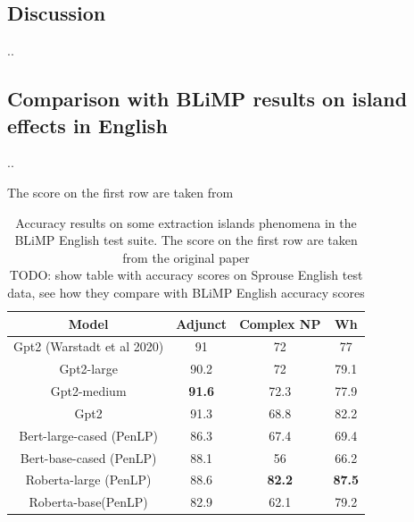 \subsection{Discussion}

..


\subsection{Comparison with BLiMP results on island effects in English}

..

The score on the first row are taken from \citet{warstadt2020blimp}

\begin{table} 
	\begin{center}
		\begin{tabular}{c|c|c|c} 
			Model & \textbf{Adjunct} & \textbf{Complex NP} & \textbf{Wh} \\
			\hline
			Gpt2 (Warstadt et al 2020) 	& 91 			& 72 			& 77 \\ 
			Gpt2-large 					& 90.2 			& 72 			& 79.1 \\ 
	  		Gpt2-medium 				& \textbf{91.6} & 72.3			& 77.9 \\
	  		Gpt2 						& 91.3 			& 68.8 			& 82.2 \\
	  		Bert-large-cased (PenLP)	& 86.3			& 67.4 			& 69.4 \\
	  		Bert-base-cased (PenLP)		& 88.1 			& 56 			& 66.2 \\
	  		Roberta-large (PenLP)		& 88.6			& \textbf{82.2}	& \textbf{87.5} \\
	  		Roberta-base(PenLP)			& 82.9			& 62.1 			& 79.2 \\   
	  		 
		\end{tabular}
		\caption{Accuracy results on some extraction islands phenomena in the BLiMP English test suite. The score on the first row are taken from the original paper \citet{warstadt2020blimp} \\ TODO: show table with accuracy scores on Sprouse English test data, see how they compare with BLiMP English accuracy scores}
		\label{tab:accResultsBLiMP}
	\end{center}
\end{table}



